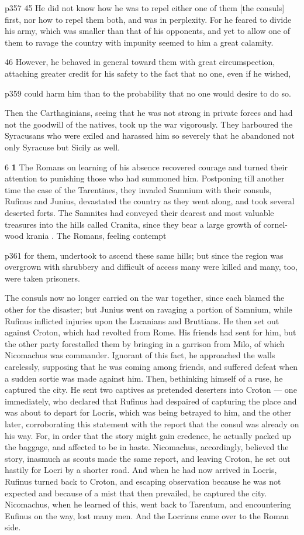 p357
45
He did not know how he was to repel either one of them [the consuls] first, nor how to repel them both, and was in perplexity. For he feared to divide his army, which was smaller than that of his opponents, and yet to allow one of them to ravage the country with impunity seemed to him a great calamity.

46
However, he behaved in general toward them with great circumspection, attaching greater credit for his safety to the fact that no one, even if he wished,

p359 could harm him than to the probability that no one would desire to do so.

Then the Carthaginians, seeing that he was not strong in private forces and had not the goodwill of the natives, took up the war vigorously. They harboured the Syracusans who were exiled and harassed him so severely that he abandoned not only Syracuse but Sicily as well.

6 \textbf{1} The Romans on learning of his absence recovered courage and turned their attention to punishing those who had summoned him. Postponing till another time the case of the Tarentines, they invaded Samnium with their consuls, Rufinus and Junius, devastated the country as they went along, and took several deserted forts. The Samnites had conveyed their dearest and most valuable treasures into the hills called Cranita, since they bear a large growth of cornel-wood krania . The Romans, feeling contempt

p361 for them, undertook to ascend these same hills; but since the region was overgrown with shrubbery and difficult of access many were killed and many, too, were taken prisoners.

The consuls now no longer carried on the war together, since each blamed the other for the disaster; but Junius went on ravaging a portion of Samnium, while Rufinus inflicted injuries upon the Lucanians and Bruttians. He then set out against Croton, which had revolted from Rome. His friends had sent for him, but the other party forestalled them by bringing in a garrison from Milo, of which Nicomachus was commander. Ignorant of this fact, he approached the walls carelessly, supposing that he was coming among friends, and suffered defeat when a sudden sortie was made against him. Then, bethinking himself of a ruse, he captured the city. He sent two captives as pretended deserters into Croton \texthebrew{—} one immediately, who declared that Rufinus had despaired of capturing the place and was about to depart for Locris, which was being betrayed to him, and the other later, corroborating this statement with the report that the consul was already on his way. For, in order that the story might gain credence, he actually packed up the baggage, and affected to be in haste. Nicomachus, accordingly, believed the story, inasmuch as scouts made the same report, and leaving Croton, he set out hastily for Locri by a shorter road. And when he had now arrived in Locris, Rufinus turned back to Croton, and escaping observation because he was not expected and because of a mist that then prevailed, he captured the city. Nicomachus, when he learned of this, went back to Tarentum, and encountering Eufinus on the way, lost many men. And the Locrians came over to the Roman side.


